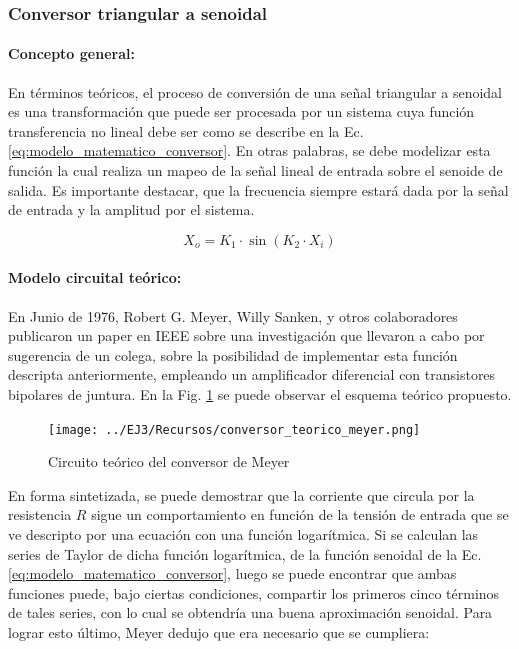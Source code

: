 \subsubsection{Conversor triangular a senoidal}

\paragraph{Concepto general:} En t\'erminos te\'oricos, el proceso de conversi\'on de una se\~nal triangular a senoidal es una transformaci\'on que puede ser procesada por un sistema
cuya funci\'on transferencia no lineal debe ser como se describe en la Ec. \ref{eq:modelo_matematico_conversor}. En otras palabras, se debe modelizar esta funci\'on la cual realiza
un mapeo de la se\~nal lineal de entrada sobre el senoide de salida. Es importante destacar, que la frecuencia siempre estar\'a dada por la se\~nal de entrada y la amplitud por el sistema.

\begin{equation}
    X_o = K_1 \cdot \sin{(K_2 \cdot X_i)}
    \label{eq:modelo_matematico_conversor}
\end{equation}

\paragraph{Modelo circuital te\'orico:} En Junio de 1976, Robert G. Meyer, Willy Sanken, y otros colaboradores publicaron un paper en IEEE sobre una investigaci\'on que llevaron a cabo por sugerencia de un colega, sobre la posibilidad de implementar esta funci\'on
descripta anteriormente, empleando un amplificador diferencial con transistores bipolares de juntura. En la Fig. \ref{fig:conversor_teorico_meyer} se puede observar el esquema te\'orico propuesto.

\begin{figure}[H]
    \centering
    \texttt{[image: ../EJ3/Recursos/conversor\_teorico\_meyer.png]}
    \caption{Circuito te\'orico del conversor de Meyer}
    \label{fig:conversor_teorico_meyer}
\end{figure}

En forma sintetizada, se puede demostrar que la corriente que circula por la resistencia $R$ sigue un comportamiento en funci\'on de la tensi\'on de entrada que se ve descripto
por una ecuaci\'on con una funci\'on logar\'itmica. Si se calculan las series de Taylor de dicha funci\'on logar\'itmica, de la funci\'on senoidal de la Ec. \ref{eq:modelo_matematico_conversor},
luego se puede encontrar que ambas funciones puede, bajo ciertas condiciones, compartir los primeros cinco t\'erminos de tales series, con lo cual se obtendr\'ia una buena aproximaci\'on senoidal. 
Para lograr esto \'ultimo, Meyer dedujo que era necesario que se cumpliera:

